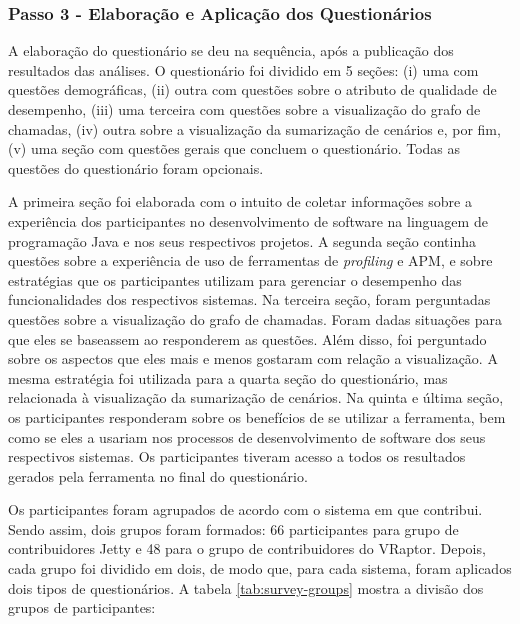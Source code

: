 \subsubsection{Passo 3 - Elaboração e Aplicação dos Questionários} \label{subsec:avaliacao-procedimentos-passo-3}

A elaboração do questionário se deu na sequência, após a publicação dos resultados das análises. O questionário foi dividido em 5 seções: (i) uma com questões demográficas, (ii) outra com questões sobre o atributo de qualidade de desempenho, (iii) uma terceira com questões sobre a visualização do grafo de chamadas, (iv) outra sobre a visualização da sumarização de cenários e, por fim, (v) uma seção com questões gerais que concluem o questionário. Todas as questões do questionário foram opcionais.

A primeira seção foi elaborada com o intuito de coletar informações sobre a experiência dos participantes no desenvolvimento de software na linguagem de programação Java e nos seus respectivos projetos. A segunda seção continha questões sobre a experiência de uso de ferramentas de \textit{profiling} e APM, e sobre estratégias que os participantes utilizam para gerenciar o desempenho das funcionalidades dos respectivos sistemas. Na terceira seção, foram perguntadas questões sobre a visualização do grafo de chamadas. Foram dadas situações para que eles se baseassem ao responderem as questões. Além disso, foi perguntado sobre os aspectos que eles mais e menos gostaram com relação a visualização. A mesma estratégia foi utilizada para a quarta seção do questionário, mas relacionada à visualização da sumarização de cenários. Na quinta e última seção, os participantes responderam sobre os benefícios de se utilizar a ferramenta, bem como se eles a usariam nos processos de desenvolvimento de software dos seus respectivos sistemas. Os participantes tiveram acesso a todos os resultados gerados pela ferramenta no final do questionário.

Os participantes foram agrupados de acordo com o sistema em que contribui. Sendo assim, dois grupos foram formados: 66 participantes para grupo de contribuidores Jetty e 48 para o grupo de contribuidores do VRaptor. Depois, cada grupo foi dividido em dois, de modo que, para cada sistema, foram aplicados dois tipos de questionários. A tabela \ref{tab:survey-groups} mostra a divisão dos grupos de participantes:

